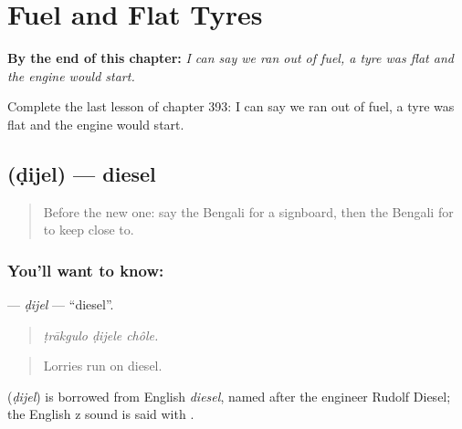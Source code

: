 
\chapter{Fuel and Flat Tyres}
\label{ch:bn-fuel-and-flat-tyres}

\begin{chapteropening}
\textbf{By the end of this chapter:} \emph{I can say we ran out of fuel, a tyre was flat and the engine would start.}

Complete the last lesson of chapter 393: I can say we ran out of fuel, a tyre was flat and the engine would start.
\end{chapteropening}

\section[\texorpdfstring{\bn{ডিজেল} (ḍijel)}{ডিজেল (ḍijel)}]{ (ḍijel) — diesel}

\label{lesson:BN-C393-dijel}



\begin{quote}
Before the new one: say the Bengali for a signboard, then the Bengali for to keep close to.
\end{quote}

\subsection*{You'll want to know: }
\textbf{} — \emph{ḍijel} — \textquotedblleft{}diesel\textquotedblright{}.

\begin{quote}
  
\end{quote}

\begin{quote}
\emph{ṭrākgulo ḍijele chôle.}
\end{quote}

\begin{quote}
Lorries run on diesel.
\end{quote}

\begin{cousinweb}
\textbf{} (\emph{ḍijel}) is borrowed from English \emph{diesel}, named after the engineer Rudolf Diesel; the English z sound is said with .
\end{cousinweb}

